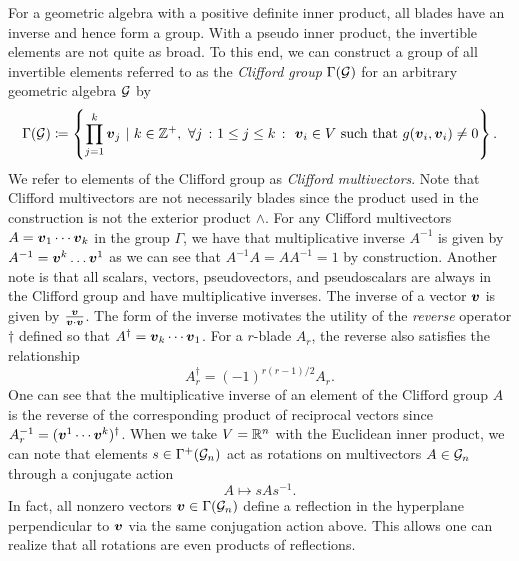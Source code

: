 For a geometric algebra with a positive definite inner product, all blades have an inverse and hence form a group. With a pseudo inner product, the invertible elements are not quite as broad. To this end, we can construct a group of all invertible elements referred to as the \emph{Clifford group} $\Gamma(\mathcal{G})$ for an arbitrary geometric algebra $\mathcal{G}$ by
\begin{equation}
\Gamma(\mathcal{G}) \coloneqq \left\{ \prod_{j=1}^k \boldsymbol{v}_j ~\vert~ k\in \mathbb{Z}^+,~ \forall j~\colon1\leq j \leq k~\colon~\boldsymbol{v}_i \in V ~\textrm{such that}~ g(\boldsymbol{v}_i,\boldsymbol{v}_i)\neq 0\right\}.
\end{equation}
We refer to elements of the Clifford group as \emph{Clifford multivectors}. Note that Clifford multivectors are not necessarily blades since the product used in the construction is not the exterior product $\wedge$. For any Clifford multivectors $A = \boldsymbol{v}_1 \cdots \boldsymbol{v}_k$ in the group $\Gamma$, we have that multiplicative inverse $A^{-1}$ is given by $A^{-1} = \boldsymbol{v}^k \dots \boldsymbol{v}^1$ as we can see that $A^{-1}A=AA^{-1} = 1$ by construction.  Another note is that all scalars, vectors, pseudovectors, and pseudoscalars are always in the Clifford group and have multiplicative inverses. The inverse of a vector $\boldsymbol{v}$ is given by $\frac{\boldsymbol{v}}{\boldsymbol{v}\cdot\boldsymbol{v}}$. The form of the inverse motivates the utility of the \emph{reverse} operator $\dagger$ defined so that $A^\dagger = \boldsymbol{v}_k \cdots \boldsymbol{v}_1$. For a $r$-blade $A_r$, the reverse also satisfies the relationship
\begin{equation}
\label{eq:reverse_sign}
A_r^\dagger = (-1)^{r(r-1)/2} A_r.
\end{equation}
One can see that the multiplicative inverse of an element of the Clifford group $A$ is the reverse of the corresponding product of reciprocal vectors since $A_r^{-1} = (\boldsymbol{v}^1 \cdots \boldsymbol{v}^k)^\dagger$. When we take $V=\mathbb{R}^n$ with the Euclidean inner product, we can note that elements $s \in \Gamma^+(\mathcal{G}_n)$ act as rotations on multivectors $A\in \mathcal{G}_n$ through a conjugate action
\begin{equation}
A \mapsto s A s^{-1}.
\end{equation}
In fact, all nonzero vectors $\boldsymbol{v}\in\Gamma(\mathcal{G}_n)$ define a reflection in the hyperplane perpendicular to $\boldsymbol{v}$ via the same conjugation action above. This allows one can realize that all rotations are even products of reflections.

